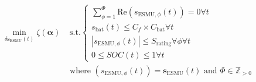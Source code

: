 \begin{equation}
\begin{split}
	\min_{\delta \textbf{s}_\text{ESMU}(t)} \zeta(\boldsymbol{\alpha})
	&\text{ s.t.}
	\begin{cases}
		\sum_{\phi=1}^{\Phi} \text{Re} \left(s_{\text{ESMU},\phi}(t)\right) = 0 \forall t\\
		s_\text{bat}(t) \leq C_f\times C_\text{bat} \forall t\\
		\left|s_{\text{ESMU},\phi}(t)\right| \leq S_\text{rating} \forall \phi \forall t\\
		0 \leq SOC(t) \leq 1 \forall t
	\end{cases}\\
	&\text{ where } (s_{\text{ESMU},\phi}(t)) = \textbf{s}_\text{ESMU}(t) \text{ and } \Phi \in \mathbb{Z}_{>0}
\end{split}
\label{ch1:equ:closed-loop-minimisation}
\end{equation}
